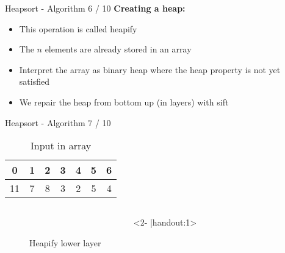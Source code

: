 
\begin{frame}{Heapsort - Algorithm 6 / 10}
  \textbf{Creating a heap:}
  \begin{itemize}
    \item
      This operation is called {\color{MainA}heapify}
    \item<2- |handout:1>
      The {\color{MainA}$n$} elements are already stored in an array
    \item<3- |handout:1>
      Interpret the array as binary heap where the {\color{MainA}heap property} is not yet satisfied
    \item<4- |handout:1>
      We repair the heap from bottom up (in layers) with {\color{MainA}sift}
  \end{itemize}
\end{frame}


\begin{frame}{Heapsort - Algorithm 7 / 10}
  \vspace{-1.0em}
  \begin{table}[!h]%
    \caption{Input in array}%
    \label{tab:heapify_numbers}%
    \begin{tabular}{ccccccc}
      {\color{MainB}0}&
      {\color{MainB}1}&
      {\color{MainB}2}&
      {\color{MainB}3}&
      {\color{MainB}4}&
      {\color{MainB}5}&
      {\color{MainB}6}\\
      \hline
      \multicolumn{1}{|c}{11}&%
      \multicolumn{1}{|c}{7}&%
      \multicolumn{1}{|c}{8}&%
      \multicolumn{1}{|c}{3}&%
      \multicolumn{1}{|c}{2}&%
      \multicolumn{1}{|c}{5}&%
      \multicolumn{1}{|c|}{4}\\
      \hline
    \end{tabular}
  \end{table}
  \vspace*{-0.5em}
  \begin{centering}
    \begin{figure}[!h]%
      \begin{columns}%
        \begin{column}{0.425\textwidth}%
          \begin{adjustbox}{width=\linewidth}%
          \end{adjustbox}%
        \end{column}%
        \begin{column}{0.425\textwidth}<2- |handout:1>%
          \begin{adjustbox}{width=\linewidth}%
          \end{adjustbox}%
        \end{column}%
      \end{columns}%
      \caption{Heapify lower layer}%
      \label{fig:heapify_lower}%
    \end{figure}
  \end{centering}
\end{frame}

